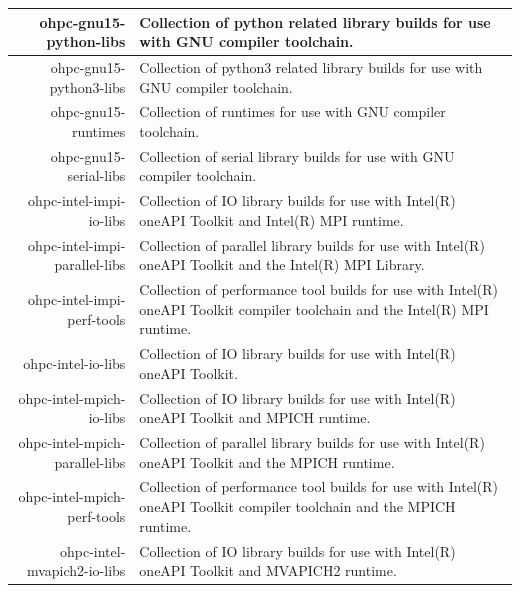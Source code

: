 \begin{tabularx}{\textwidth}{r|X}
\hline
ohpc-gnu15-python-libs & Collection of python related library builds for use with GNU compiler toolchain. \\
\hline
ohpc-gnu15-python3-libs & Collection of python3 related library builds for use with GNU compiler toolchain. \\
\hline
ohpc-gnu15-runtimes & Collection of runtimes for use with GNU compiler toolchain. \\
\hline
ohpc-gnu15-serial-libs & Collection of serial library builds for use with GNU compiler toolchain. \\
\hline
ohpc-intel-impi-io-libs & Collection of IO library builds for use with Intel(R) oneAPI Toolkit and Intel(R) MPI runtime. \\
\hline
ohpc-intel-impi-parallel-libs & Collection of parallel library builds for use with Intel(R) oneAPI Toolkit and the Intel(R) MPI Library. \\
\hline
ohpc-intel-impi-perf-tools & Collection of performance tool builds for use with Intel(R) oneAPI Toolkit compiler toolchain and the Intel(R) MPI runtime. \\
\hline
ohpc-intel-io-libs & Collection of IO library builds for use with Intel(R) oneAPI Toolkit. \\
\hline
ohpc-intel-mpich-io-libs & Collection of IO library builds for use with Intel(R) oneAPI Toolkit and MPICH runtime. \\
\hline
ohpc-intel-mpich-parallel-libs & Collection of parallel library builds for use with Intel(R) oneAPI Toolkit and the MPICH runtime. \\
\hline
ohpc-intel-mpich-perf-tools & Collection of performance tool builds for use with Intel(R) oneAPI Toolkit compiler toolchain and the MPICH runtime. \\
\hline
ohpc-intel-mvapich2-io-libs & Collection of IO library builds for use with Intel(R) oneAPI Toolkit and MVAPICH2 runtime. \\
\hline
\bottomrule
\end{tabularx}
